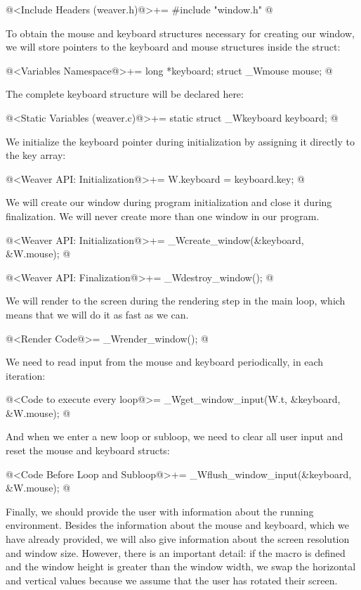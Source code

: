 \iniciocodigo
@<Include Headers (weaver.h)@>+=
#include "window.h"
@
\fimcodigo

To obtain the mouse and keyboard structures necessary for creating our
window, we will store pointers to the keyboard and mouse structures
inside the  struct:

\iniciocodigo
@<Variables Namespace@>+=
long *keyboard;
struct _Wmouse mouse;
@
\fimcodigo

The complete keyboard structure will be declared here:

\iniciocodigo
@<Static Variables (weaver.c)@>+=
static struct _Wkeyboard keyboard;
@
\fimcodigo

We initialize the keyboard pointer during initialization by assigning
it directly to the key array:


\iniciocodigo
@<Weaver API: Initialization@>+=
W.keyboard = keyboard.key;
@
\fimcodigo

We will create our window during program initialization and close it
during finalization. We will never create more than one window in our
program.

\iniciocodigo
@<Weaver API: Initialization@>+=
_Wcreate_window(&keyboard, &W.mouse);
@
\fimcodigo

\iniciocodigo
@<Weaver API: Finalization@>+=
_Wdestroy_window();
@
\fimcodigo

We will render to the screen during the rendering step in the main
loop, which means that we will do it as fast as we can.

\iniciocodigo
@<Render Code@>=
_Wrender_window();
@
\fimcodigo

We need to read input from the mouse and keyboard periodically, in
each iteration:

\iniciocodigo
@<Code to execute every loop@>=
_Wget_window_input(W.t, &keyboard, &W.mouse);
@
\fimcodigo

And when we enter a new loop or subloop, we need to clear all user
input and reset the mouse and keyboard structs:

\iniciocodigo
@<Code Before Loop and Subloop@>+=
_Wflush_window_input(&keyboard, &W.mouse);
@
\fimcodigo

Finally, we should provide the user with information about the running
environment. Besides the information about the mouse and keyboard,
which we have already provided, we will also give information about
the screen resolution and window size. However, there is an important
detail: if the macro  is defined and the
window height is greater than the window width, we swap the horizontal
and vertical values because we assume that the user has rotated their
screen.

